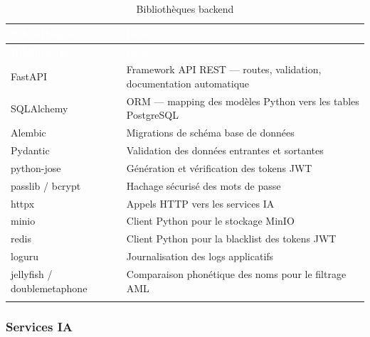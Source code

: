 \renewcommand{\arraystretch}{1.3}
\begin{longtable}{|p{4.5cm}|p{10cm}|}
  \rowcolor{bleu_principal}
  \textcolor{white}{\textbf{Bibliothèque}} & \textcolor{white}{\textbf{Rôle}} \\
  \hline
  \endfirsthead
  \rowcolor{bleu_principal}
  \textcolor{white}{\textbf{Bibliothèque}} & \textcolor{white}{\textbf{Rôle}} \\
  \hline
  \endhead
  FastAPI                    & Framework API REST --- routes, validation, documentation automatique \\ \hline
  SQLAlchemy                 & ORM --- mapping des modèles Python vers les tables PostgreSQL \\ \hline
  Alembic                    & Migrations de schéma base de données \\ \hline
  Pydantic                   & Validation des données entrantes et sortantes \\ \hline
  python-jose                & Génération et vérification des tokens JWT \\ \hline
  passlib / bcrypt           & Hachage sécurisé des mots de passe \\ \hline
  httpx                      & Appels HTTP vers les services IA \\ \hline
  minio                      & Client Python pour le stockage MinIO \\ \hline
  redis                      & Client Python pour la blacklist des tokens JWT \\ \hline
  loguru                     & Journalisation des logs applicatifs \\ \hline
  jellyfish / doublemetaphone & Comparaison phonétique des noms pour le filtrage AML \\ \hline
  \caption{Bibliothèques backend}
  \label{tab:ch6-backend}
\end{longtable}

\subsubsection{Services IA}

